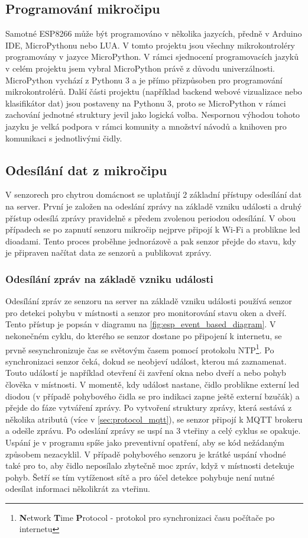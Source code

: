 \subsection*{Programování mikročipu} \label{subsec:microchip_programming}
Samotné ESP8266 může být programováno v několika jazycích, předně v Arduino IDE, MicroPythonu nebo LUA. V tomto projektu jsou všechny mikrokontroléry programovány v jazyce MicroPython. V rámci sjednocení programovacích jazyků v celém projektu jsem vybral MicroPython právě z důvodu univerzálnosti. MicroPython vychází z Pythonu 3 a je přímo přizpůsoben pro programování mikrokontrolérů. Další části projektu (například backend webové vizualizace nebo klasifikátor dat) jsou postaveny na Pythonu 3, proto se MicroPython v rámci zachování jednotné struktury jevil jako logická volba. Nespornou výhodou tohoto jazyku je velká podpora v rámci komunity a množství návodů a knihoven pro komunikaci s jednotlivými čidly. 

\subsection*{Odesílání dat z mikročipu}
V senzorech pro chytrou domácnost se uplatňují 2 základní přístupy odesílání dat na server. První je založen na odeslání zprávy na základě vzniku události a druhý přístup odesílá zprávy pravidelně s předem zvolenou periodou odesílání. V obou případech se po zapnutí senzoru mikročip nejprve připojí k Wi-Fi a problikne led dioadami. Tento proces proběhne jednorázově a pak senzor přejde do stavu, kdy je připraven načítat data ze senzorů a publikovat zprávy.

\subsubsection*{Odesílání zpráv na základě vzniku události} \label{subsec:event_based_msg}
Odesílání zpráv ze senzoru na server na základě vzniku události používá senzor pro detekci pohybu v místnosti a senzor pro monitorování stavu oken a dveří. Tento přístup je popsán v diagramu na \cref{fig:esp_event_based_diagram}. V nekonečném cyklu, do kterého se senzor dostane po připojení k internetu, se prvně sesynchronizuje čas se světovým časem pomocí protokolu NTP\footnote{\textbf{N}etwork \textbf{T}ime \textbf{P}rotocol - protokol pro synchronizaci času počítače po internetu}. Po synchronizaci senzor čeká, dokud se neobjeví událost, kterou má zaznamenat. Touto událostí je například otevření či zavření okna nebo dveří a nebo pohyb člověka v místnosti. V momentě, kdy událost nastane, čidlo problikne externí led diodou (v případě pohybového čidla se pro indikaci zapne ještě externí bzučák) a přejde do fáze vytváření zprávy. Po vytvoření struktury zprávy, která sestává z několika atributů (více v \cref{sec:protocol_mqtt}), se senzor připojí k MQTT brokeru a odešle zprávu. Po odeslání zprávy se uspí na 3 vteřiny a celý cyklus se opakuje. Uspání je v programu spíše jako preventivní opatření, aby se kód nežádaným způsobem nezacyklil. V případě pohybového senzoru je krátké uspání vhodné také pro to, aby čidlo neposílalo zbytečně moc zpráv, když v místnosti detekuje pohyb. Šetří se tím vytíženost sítě a pro účel detekce pohybuje není nutné odesílat informaci několikrát za vteřinu.

